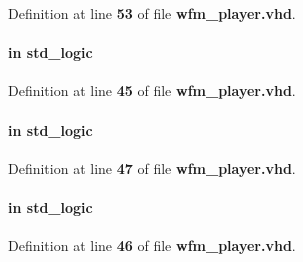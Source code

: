 Definition at line {\bf 53} of file {\bf wfm\+\_\+player.\+vhd}.

\paragraph[{rcmd\+\_\+clk}]{ {\bfseries \textcolor{keywordflow}{in}\textcolor{vhdlchar}{ }} {\bfseries \textcolor{comment}{std\+\_\+logic}\textcolor{vhdlchar}{ }} \hspace{0.3cm}{\ttfamily [Port]}}\label{classwfm__player_a786c634c7706d2b15cba8b3621002f7a}


Definition at line {\bf 45} of file {\bf wfm\+\_\+player.\+vhd}.

\paragraph[{rcmd\+\_\+rdy}]{ {\bfseries \textcolor{keywordflow}{in}\textcolor{vhdlchar}{ }} {\bfseries \textcolor{comment}{std\+\_\+logic}\textcolor{vhdlchar}{ }} \hspace{0.3cm}{\ttfamily [Port]}}\label{classwfm__player_a7ceb3a2a34d06fe063a3974176cc5280}


Definition at line {\bf 47} of file {\bf wfm\+\_\+player.\+vhd}.

\paragraph[{rcmd\+\_\+reset\+\_\+n}]{ {\bfseries \textcolor{keywordflow}{in}\textcolor{vhdlchar}{ }} {\bfseries \textcolor{comment}{std\+\_\+logic}\textcolor{vhdlchar}{ }} \hspace{0.3cm}{\ttfamily [Port]}}\label{classwfm__player_af69092233cc111b9f7592413282f334a}


Definition at line {\bf 46} of file {\bf wfm\+\_\+player.\+vhd}.

